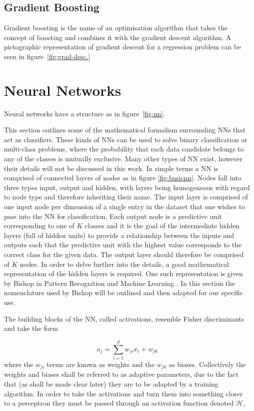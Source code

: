 \subsection{Gradient Boosting}

Gradient boosting is the name of an optimisation algorithm that takes the
concept of boosting and combines it with the gradient descent algorithm. A
pictographic representation of gradient descent for a regression problem can be
seen in figure~\ref{fig:grad-desc.}


\section{Neural Networks}%
\label{sec:neural-networks}
Neural networks have a structure as in figure~\ref{fig:nn}.

This section outlines some of the mathematical formalism surrounding NNs
that act as classifiers. These kinds of NNs can be used to solve binary
classification or multi-class problems, where the probability that each data
candidate belongs to any of the classes is mutually exclusive. Many other types
of NN exist, however their details will not be discussed in this work. In simple
terms a NN is comprised of connected layers of nodes as in figure
\ref{fig:basicnn}. Nodes fall into three types input, output and hidden, with
layers being homogeneous with regard to node type and therefore inheriting their
name. The input layer is comprised of one input node per dimension of a single
entry in the dataset that one wishes to pass into the NN for classification.
Each output node is a predictive unit corresponding to one of $K$ classes and it
is the goal of the intermediate hidden layers (full of hidden units) to provide
a relationship between the inputs and outputs such that the predictive unit with
the highest value corresponds to the correct class for the given data. The
output layer should therefore be comprised of $K$ nodes. In order to delve
further into the details, a good mathematical representation of the hidden
layers is required. One such representation is given by Bishop in Pattern
Recognition and Machine Learning \cite{PRML}. In this section the nomenclature
used by Bishop will be outlined and then adapted for our specific use.


The building blocks of the NN, called activations, resemble Fisher
discriminants \cite{Fisher} and take the form

\begin{equation}
a_j = \sum_{i=1}^{d} w_{ji}x_{i} + w_{j0}
\label{eq:fisher}
\end{equation}
where the $w_{ji}$ terms are known as weights and the $w_{j0}$ as biases.
Collectively the weights and biases shall be referred to as adaptive parameters,
due to the fact that (as shall be made clear later) they are to be adapted by a
training algorithm. In order to take the activations and turn them into
something closer to a perceptron \cite{Rosenblatt} they must be passed through
an activation function denoted $\mathcal{H}$,

